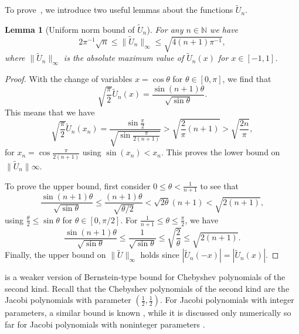 \documentclass{article}
\newtheorem{lemma}{Lemma}
\begin{document}
To prove~, we introduce two useful lemmas about the functions $\tilde{U}_n$. 
\begin{lemma}[Uniform norm bound of $\tilde{U}_n$]\label{lem:Unbound}
For any $n\in\mathbb{N}$ we have 
\begin{equation*}
    2\pi^{-1}\sqrt{n} \leq \|\tilde{U}_n\|_\infty \leq \sqrt{4(n+1)\pi^{-1}},
\end{equation*} 
where $\|\tilde{U}_n\|_\infty$ is the absolute maximum value of $\tilde{U}_n(x)$ for $x\in[-1,1]$. 
\end{lemma}
\begin{proof}
With the change of variables $x=\cos\theta$ for $\theta\in[0, \pi]$, we find that 
\begin{equation*}
    \sqrt{\frac{\pi}{2}}\tilde{U}_n(x) = \frac{\sin (n+1)\theta}{\sqrt{\sin{\theta}}}.
\end{equation*}
This means that we have 
\begin{equation*}
    \sqrt{\frac{\pi}{2}}\tilde{U}_n(x_n) = \frac{\sin{\frac{\pi}{2}}}{\sqrt{\sin{\frac{\pi}{2(n+1)}}}} > \sqrt{\frac{2}{\pi}(n+1)}> \sqrt{\frac{2n}{\pi}},
\end{equation*}
for $x_n=\cos\frac{\pi}{2(n+1)}$ using $\sin(x_n)< x_n$. This proves the lower bound on $\|\tilde{U}_n\|\infty$. 

\par To prove the upper bound, first consider $0\leq \theta<\frac{1}{n+1}$ to see that
\begin{equation*}
    \frac{\sin (n+1)\theta}{\sqrt{\sin{\theta}}} \leq \frac{(n+1)\theta}{\sqrt{\theta/2}} < \sqrt{2\theta}(n+1) < \sqrt{2(n+1)},
\end{equation*}
using $\frac{\theta}{2}\leq \sin\theta$ for $\theta\in[0, \pi/2]$. For $\frac{1}{n+1}\leq \theta \leq \frac{\pi}{2}$, we have
\begin{equation*}
    \frac{\sin (n+1)\theta}{\sqrt{\sin{\theta}}} \leq \frac{1}{\sqrt{\sin\theta}} \leq \sqrt{\frac{2}{\theta}} \leq \sqrt{2(n+1)}. 
\end{equation*}
Finally, the upper bound on $\|\tilde{U}\|_\infty$ holds since $|\tilde{U}_n(-x)| = |\tilde{U}_n(x)|$. 
\end{proof}

 is a weaker version of Bernstein-type bound for Chebyshev polynomials of the second kind. Recall that the Chebyshev polynomials of the second kind are the Jacobi polynomials with parameter $(\frac{1}{2}, \frac{1}{2})$. For Jacobi polynomials with integer parameters, a similar bound is known \citep{haagerup2014inequalities}, while it is discussed only numerically so far for Jacobi polynomials with noninteger parameters \citep[Remark 4.4]{koornwinder2018jacobi}.
\end{document}
